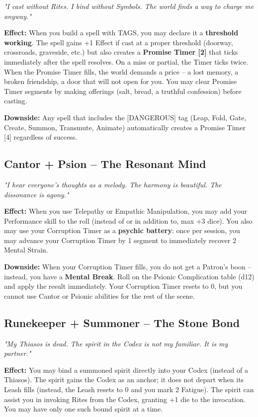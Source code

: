 \documentclass[10pt,a5paper]{book}
\begin{document}
\textit{"I cast without Rites. I bind without Symbols. The world finds a way to charge me anyway."}

\textbf{Effect:} When you build a spell with TAGS, you may declare it a \textbf{threshold working}. The spell gains +1 Effect if cast at a proper threshold (doorway, crossroads, graveside, etc.) but also creates a \textbf{Promise Timer [2]} that ticks immediately after the spell resolves. On a miss or partial, the Timer ticks twice. When the Promise Timer fills, the world demands a price -- a lost memory, a broken friendship, a door that will not open for you. You may clear Promise Timer segments by making offerings (salt, bread, a truthful confession) before casting.

\textbf{Downside:} Any spell that includes the [DANGEROUS] tag (Leap, Fold, Gate, Create, Summon, Transmute, Animate) automatically creates a Promise Timer [4] regardless of success.

\subsection*{Cantor + Psion -- The Resonant Mind}

\textit{"I hear everyone's thoughts as a melody. The harmony is beautiful. The dissonance is agony."}

\textbf{Effect:} When you use Telepathy or Empathic Manipulation, you may add your Performance skill to the roll (instead of or in addition to, max +3 dice). You also may use your Corruption Timer as a \textbf{psychic battery}: once per session, you may advance your Corruption Timer by 1 segment to immediately recover 2 Mental Strain.

\textbf{Downside:} When your Corruption Timer fills, you do not get a Patron's boon -- instead, you have a \textbf{Mental Break}. Roll on the Psionic Complication table (d12) and apply the result immediately. Your Corruption Timer resets to 0, but you cannot use Cantor or Psionic abilities for the rest of the scene.

\subsection*{Runekeeper + Summoner -- The Stone Bond}

\textit{"My Thiasos is dead. The spirit in the Codex is not my familiar. It is my partner."}

\textbf{Effect:} You may bind a summoned spirit directly into your Codex (instead of a Thiasos). The spirit gains the Codex as an anchor; it does not depart when its Leash fills (instead, the Leash resets to 0 and you mark 2 Fatigue). The spirit can assist you in invoking Rites from the Codex, granting +1 die to the invocation. You may have only one such bound spirit at a time.
\end{document}
